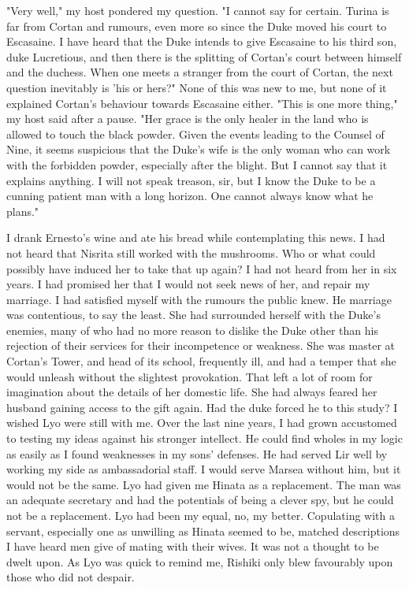 \documentclass{article}
\begin{document}
"Very well," my host pondered my question. "I cannot say for certain. Turina is far from Cortan and rumours, even more so since the Duke moved his court to Escasaine. I have heard that the Duke intends to give Escasaine to his third son, duke Lucretious, and then there is the splitting of Cortan's court between himself and the duchess. When one meets a stranger from the court of  Cortan, the next question inevitably is 'his or hers?" None of this was new to me, but none of it explained Cortan's behaviour towards Escasaine either. "This is one more thing," my host said after a pause. "Her grace is the only healer in the land who is allowed to touch the black powder. Given the events leading to the Counsel of Nine, it seems suspicious that the Duke's wife is the only woman who can work with the forbidden powder, especially after the blight. But I cannot say that it explains anything. I will not speak treason, sir, but I know the Duke to be a cunning patient man with a long horizon. One cannot always know what he plans."

I drank Ernesto's wine and ate his bread while contemplating this news. I had not heard that Nisrita still worked with the mushrooms. Who or what could possibly have induced her to take that up again? I had not heard from her in six years. I had promised her that I would not seek news of her, and repair my marriage. I had satisfied myself with the rumours the public knew. He marriage was contentious, to say the least. She had surrounded herself with the Duke's enemies, many of who had no more reason to dislike the Duke other than his rejection of their services for their incompetence or weakness. She was master at Cortan's Tower, and head of its school, frequently ill, and had a temper that she would unleash without the slightest provokation. That left a lot of room for imagination about the details of her domestic life. She had always feared her husband gaining access to the gift again. Had the duke forced he to this study? I wished Lyo were still with me. Over the last nine years, I had grown accustomed to testing my ideas against his stronger intellect. He could find wholes in my logic as easily as I found weaknesses in my sons' defenses. He had served Lir well by working my side as ambassadorial staff.  I would serve Marsea without him, but it would not be the same. Lyo had given me Hinata as a replacement. The man was an adequate secretary and had the potentials of being a clever spy, but he could not be a replacement. Lyo had been my equal, no, my better. Copulating with a servant, especially one as unwilling as Hinata seemed to be, matched descriptions I have heard men give of mating with their wives. It was not a thought to be dwelt upon. As Lyo was quick to remind me, Rishiki only blew favourably upon those who did not despair.
\end{document}
